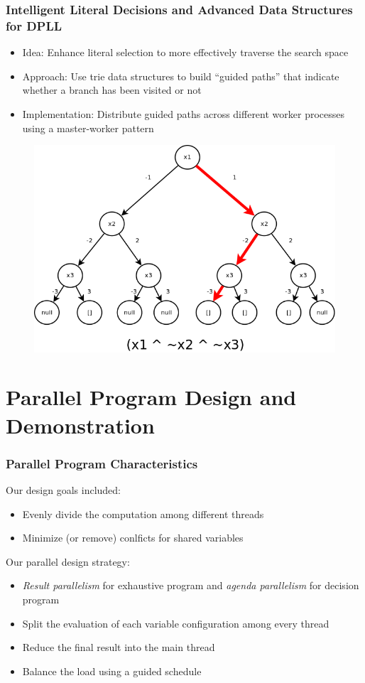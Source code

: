 \documentclass[handout,10pt]{beamer}
\begin{document}
\begin{frame}
	\frametitle{Intelligent Literal Decisions and Advanced Data Structures for DPLL}
	\begin{itemize}
		\item Idea: Enhance literal selection to more effectively traverse the search space
		\item Approach: Use trie data structures to build ``guided paths'' that indicate whether a branch has been visited or not
		\item Implementation: Distribute guided paths across different worker processes using a master-worker pattern
	\end{itemize}
\begin{figure}
\centering
\includegraphics[scale = 0.2]{trie.png}
\end{figure}
\end{frame}

\section{Parallel Program Design and Demonstration}
\begin{frame}
	\frametitle{Parallel Program Characteristics}
	Our design goals included:
	\begin{itemize}
		\item Evenly divide the computation among different threads
		\item Minimize (or remove) conlficts for shared variables
	\end{itemize}

	\medskip

	Our parallel design strategy:
	\begin{itemize}
		\item \emph{Result parallelism} for exhaustive program and \emph{agenda parallelism} for decision program
		\item Split the evaluation of each variable configuration among every thread
		\item Reduce the final result into the main thread
		\item Balance the load using a guided schedule
	\end{itemize}
\end{frame}
\end{document}
